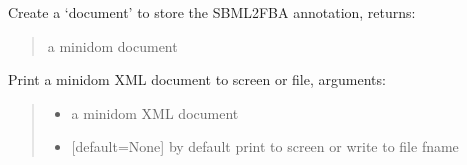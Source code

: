 \documentclass[letterpaper,12pt,english]{sphinxmanual}
\begin{document}
\begin{fulllineitems}
\label{\detokenize{api/io:cbmpy.CBXML.xml_createSBML2FBADoc}}
\pysigstartsignatures
\pysiglinewithargsret
{}
{}
{}
\pysigstopsignatures
\sphinxAtStartPar
Create a ‘document’ to store the SBML2FBA annotation, returns:
\begin{quote}\begin{description}
\sphinxAtStartPar
{} \textendash{} a minidom document

\end{description}\end{quote}

\end{fulllineitems}


\begin{fulllineitems}
\label{\detokenize{api/io:cbmpy.CBXML.xml_viewSBML2FBAXML}}
\pysigstartsignatures
\pysiglinewithargsret
{}
{\sphinxparamcomma {}}
{}
\pysigstopsignatures
\sphinxAtStartPar
Print a minidom XML document to screen or file, arguments:
\begin{quote}\begin{description}
\begin{itemize}
\item {} 
\sphinxAtStartPar
{} \textendash{} a minidom XML document

\item {} 
\sphinxAtStartPar
{} \textendash{} {[}default=None{]} by default print to screen or write to file fname

\end{itemize}

\end{description}\end{quote}

\end{fulllineitems}

\end{document}
